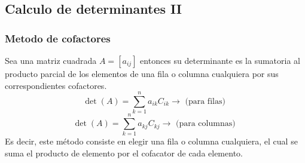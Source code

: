 \subsection*{Calculo de determinantes II}
\subsubsection*{Metodo de cofactores}
Sea una matriz cuadrada $A=[a_{ij}]$ entonces su determinante es la sumatoria al producto parcial de los elementos de una fila o columna cualquiera por sus correspondientes cofactores.
$$ \det(A)=\sum_{k=1}^{n}a_{ik}C_{ik} \longrightarrow \text{ (para filas) } $$
$$ \det(A)=\sum_{k=1}^{n}a_{kj}C_{kj} \longrightarrow \text{ (para columnas) } $$
Es decir, este método consiste en elegir una fila o columna cualquiera, el cual se suma el producto de elemento por el cofacator de cada elemento.
